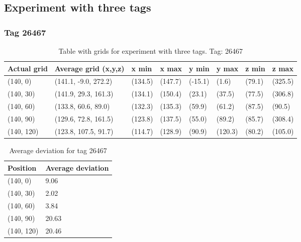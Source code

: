 \subsection{Experiment with three tags}
\subsubsection{Tag 26467}
\begin{table}[H] 
    \begin{tabular}{|l|l|l|l|l|l|l|l|}
    \hline
    Actual grid  & Average grid (x,y,z)      & x min       & x max      & y min      & y max       & z min      & z max    \\ \hline
    (140, 0)     & (141.1, -9.0, 272.2)      & (134.5)     & (147.7)    & (-15.1)    & (1.6)       & (79.1)     & (325.5)     \\ \hline
    (140, 30)    & (141.9, 29.3, 161.3)      & (134.1)     & (150.4)    & (23.1)     & (37.5)      & (77.5)     & (306.8)     \\ \hline
    (140, 60)    & (133.8, 60.6, 89.0)       & (132.3)     & (135.3)    & (59.9)     & (61.2)      & (87.5)     & (90.5)     \\ \hline
    (140, 90)    & (129.6, 72.8, 161.5)      & (123.8)     & (137.5)    & (55.0)     & (89.2)      & (85.7)     & (308.4)     \\ \hline
    (140, 120)    & (123.8, 107.5, 91.7)     & (114.7)     & (128.9)    & (90.9)     & (120.3)     & (80.2)     & (105.0)     \\ \hline
\end{tabular}
\label{Tab:three-tag-experiment-result-tag-26467}
\caption{Table with grids for experiment with three tags. Tag: 26467}
\end{table}

\begin{table}[]
    \centering
    \begin{tabular}{|l|l|}
    \hline
    Position   & Average deviation \\ \hline
    (140, 0)   & 9.06              \\ \hline
    (140, 30)  & 2.02              \\ \hline
    (140, 60)  & 3.84              \\ \hline
    (140, 90)  & 20.63             \\ \hline
    (140, 120) & 20.46             \\ \hline
    \end{tabular}
    \caption{Average deviation for tag 26467}
\end{table}

